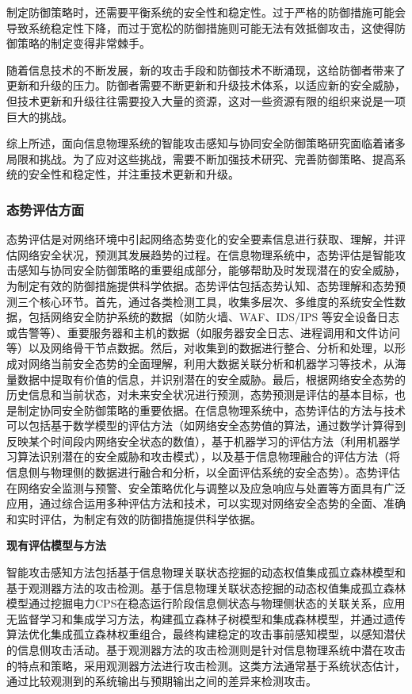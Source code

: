 制定防御策略时，还需要平衡系统的安全性和稳定性。过于严格的防御措施可能会导致系统稳定性下降，而过于宽松的防御措施则可能无法有效抵御攻击，这使得防御策略的制定变得非常棘手。

随着信息技术的不断发展，新的攻击手段和防御技术不断涌现，这给防御者带来了更新和升级的压力。防御者需要不断更新和升级技术体系，以适应新的安全威胁，但技术更新和升级往往需要投入大量的资源，这对一些资源有限的组织来说是一项巨大的挑战。

综上所述，面向信息物理系统的智能攻击感知与协同安全防御策略研究面临着诸多局限和挑战。为了应对这些挑战，需要不断加强技术研究、完善防御策略、提高系统的安全性和稳定性，并注重技术更新和升级。

\subsubsection{态势评估方面}

态势评估是对网络环境中引起网络态势变化的安全要素信息进行获取、理解，并评估网络安全状况，预测其发展趋势的过程。在信息物理系统中，态势评估是智能攻击感知与协同安全防御策略的重要组成部分，能够帮助及时发现潜在的安全威胁，为制定有效的防御措施提供科学依据。态势评估包括态势认知、态势理解和态势预测三个核心环节。首先，通过各类检测工具，收集多层次、多维度的系统安全性数据，包括网络安全防护系统的数据（如防火墙、WAF、IDS/IPS 等安全设备日志或告警等）、重要服务器和主机的数据（如服务器安全日志、进程调用和文件访问等）以及网络骨干节点数据。然后，对收集到的数据进行整合、分析和处理，以形成对网络当前安全态势的全面理解，利用大数据关联分析和机器学习等技术，从海量数据中提取有价值的信息，并识别潜在的安全威胁。最后，根据网络安全态势的历史信息和当前状态，对未来安全状况进行预测，态势预测是评估的基本目标，也是制定协同安全防御策略的重要依据。在信息物理系统中，态势评估的方法与技术可以包括基于数学模型的评估方法（如网络安全态势值的算法，通过数学计算得到反映某个时间段内网络安全状态的数值），基于机器学习的评估方法（利用机器学习算法识别潜在的安全威胁和攻击模式），以及基于信息物理融合的评估方法（将信息侧与物理侧的数据进行融合和分析，以全面评估系统的安全态势）。态势评估在网络安全监测与预警、安全策略优化与调整以及应急响应与处置等方面具有广泛应用，通过综合运用多种评估方法和技术，可以实现对网络安全态势的全面、准确和实时评估，为制定有效的防御措施提供科学依据。

\textbf{现有评估模型与方法}

智能攻击感知方法包括基于信息物理关联状态挖掘的动态权值集成孤立森林模型和基于观测器方法的攻击检测。基于信息物理关联状态挖掘的动态权值集成孤立森林模型通过挖掘电力CPS在稳态运行阶段信息侧状态与物理侧状态的关联关系，应用无监督学习和集成学习方法，构建孤立森林子树模型和集成森林模型，并通过遗传算法优化集成孤立森林权重组合，最终构建稳定的攻击事前感知模型，以感知潜伏的信息侧攻击活动。基于观测器方法的攻击检测则是针对信息物理系统中潜在攻击的特点和策略，采用观测器方法进行攻击检测。这类方法通常基于系统状态估计，通过比较观测到的系统输出与预期输出之间的差异来检测攻击。

